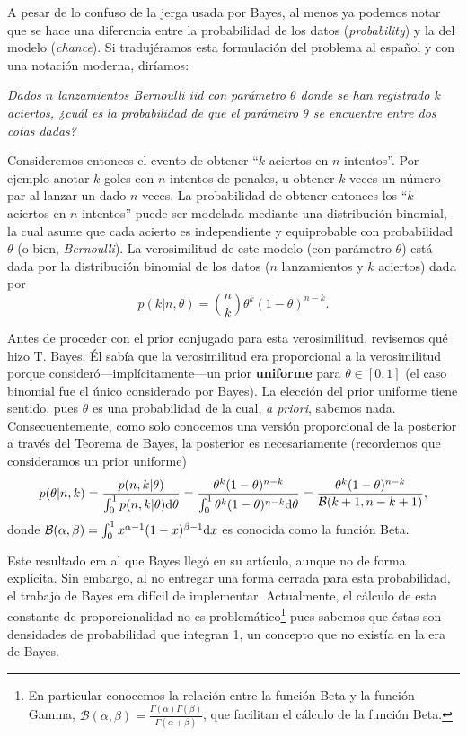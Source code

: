 A pesar de lo confuso de la jerga usada por Bayes, al menos ya podemos notar que se hace una diferencia entre la probabilidad de los datos (\emph{probability}) y la del modelo (\emph{chance}). Si tradujéramos esta formulación del problema al español y con una notación moderna, diríamos: 

\begin{center}
\it
Dados $n$ lanzamientos Bernoulli iid con parámetro $\theta$ donde se han registrado $k$ aciertos, ¿cuál es la probabilidad de que el parámetro $\theta$ se encuentre entre dos cotas dadas?
\end{center}

Consideremos entonces el evento de obtener ``$k$ aciertos en $n$ intentos''. Por ejemplo anotar $k$ goles con $n$ intentos de penales, u obtener $k$ veces un número par al lanzar un dado $n$ veces. La probabilidad de obtener entonces los ``$k$ aciertos en $n$ intentos'' puede ser modelada mediante una distribución binomial, la cual asume que cada acierto es independiente y  equiprobable con probabilidad $\theta$ (o bien, \emph{Bernoulli}). La verosimilitud de este modelo (con parámetro $\theta$) está dada por la distribución binomial de los datos ($n$ lanzamientos y $k$ aciertos) dada por
\begin{equation}
	p(k| n, \theta) = \binom{n}{k} \theta^k (1-\theta)^{n-k}.
\end{equation}

Antes de proceder con el prior conjugado para esta verosimilitud, revisemos qué hizo T. Bayes. Él sabía que la verosimilitud era proporcional a la verosimilitud porque consideró---implícitamente---un prior \textbf{uniforme} para $\theta\in [0,1]$ (el caso binomial fue el único considerado por Bayes). La elección del prior uniforme tiene sentido, pues $\theta$ es una probabilidad de la cual, \emph{a priori}, sabemos nada. Consecuentemente, como solo conocemos una versión proporcional de la posterior a través del Teorema de Bayes,  la posterior es necesariamente (recordemos que consideramos un prior uniforme)
\begin{equation}
	p(\theta|n,k) = \frac{p(n, k| \theta)}{\int_0^1 p(n, k| \theta){\text d} \theta}= \frac{\theta^k (1-\theta)^{n-k}}{\int_0^1 \theta^k (1-\theta)^{n-k}{\text d} \theta}= \frac{\theta^k (1-\theta)^{n-k}}{\mathcal{B}(k+1,n-k+1)},
\end{equation}
donde $\mathcal{B}(\alpha,\beta) = \int_0^1x^{\alpha-1}(1-x)^{\beta-1}{\text d} x$ es conocida como la función Beta.

Este resultado era al que Bayes llegó en su artículo, aunque no de forma explícita. Sin embargo, al no entregar una forma cerrada para esta probabilidad, el trabajo de Bayes era difícil de implementar. Actualmente, el cálculo de esta constante de proporcionalidad no es problemático\footnote{En particular conocemos la relación entre la función Beta y la función Gamma, $\mathcal{B}(\alpha,\beta) = \frac{\Gamma(\alpha)\Gamma(\beta)}{\Gamma(\alpha+\beta)}$, que facilitan el cálculo de la función Beta.} pues sabemos que éstas son densidades de probabilidad que integran 1, un concepto que no existía en la era de Bayes. 

